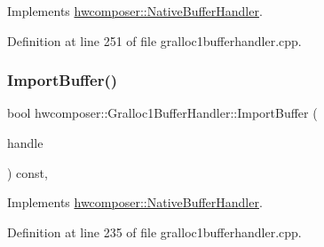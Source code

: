 Implements \mbox{\hyperlink{classhwcomposer_1_1NativeBufferHandler_a3b4115de8c13c53b6cd233f755f46dc9}{hwcomposer\+::\+Native\+Buffer\+Handler}}.



Definition at line 251 of file gralloc1bufferhandler.\+cpp.


\begin{DoxyCode}{0}
\end{DoxyCode}
\mbox{\label{classhwcomposer_1_1Gralloc1BufferHandler_a0341cd413ba6e7d422edf30a161cd2b9}} 
\subsubsection{\texorpdfstring{Import\+Buffer()}{ImportBuffer()}}
{\footnotesize\ttfamily bool hwcomposer\+::\+Gralloc1\+Buffer\+Handler\+::\+Import\+Buffer (\begin{DoxyParamCaption}\item[{\mbox{\hyperlink{alios_2platformdefines_8h_ac0a2eaf260f556d17fe489911f017bdf}{H\+W\+C\+Native\+Handle}}}]{handle }\end{DoxyParamCaption}) const\hspace{0.3cm}{\ttfamily [override]}, {\ttfamily [virtual]}}



Implements \mbox{\hyperlink{classhwcomposer_1_1NativeBufferHandler_a5841be467d2aa11e8c4d7233596fda3c}{hwcomposer\+::\+Native\+Buffer\+Handler}}.



Definition at line 235 of file gralloc1bufferhandler.\+cpp.


